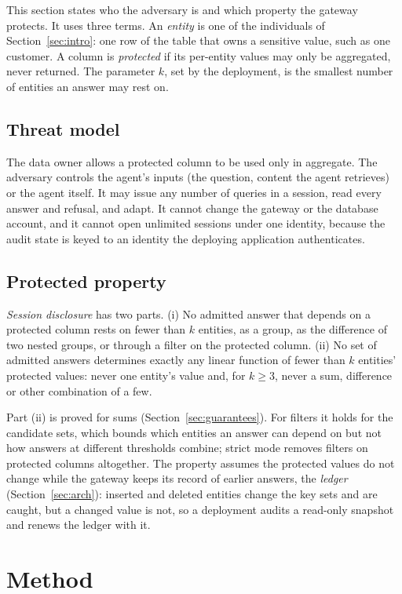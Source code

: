\documentclass[sigconf,nonacm]{acmart}
\begin{document}
This section states who the adversary is and which property the gateway protects. It uses three terms. An \emph{entity} is one of the individuals of Section~\ref{sec:intro}: one row of the table that owns a sensitive value, such as one customer. A column is \emph{protected} if its per-entity values may only be aggregated, never returned. The parameter $k$, set by the deployment, is the smallest number of entities an answer may rest on.

\subsection{Threat model}
The data owner allows a protected column to be used only in aggregate. The adversary controls the agent's inputs (the question, content the agent retrieves) or the agent itself. It may issue any number of queries in a session, read every answer and refusal, and adapt. It cannot change the gateway or the database account, and it cannot open unlimited sessions under one identity, because the audit state is keyed to an identity the deploying application authenticates.

\subsection{Protected property}
\emph{Session disclosure} has two parts. (i) No admitted answer that depends on a protected column rests on fewer than $k$ entities, as a group, as the difference of two nested groups, or through a filter on the protected column. (ii) No set of admitted answers determines exactly any linear function of fewer than $k$ entities' protected values: never one entity's value and, for $k\ge3$, never a sum, difference or other combination of a few.

Part (ii) is proved for sums (Section~\ref{sec:guarantees}). For filters it holds for the candidate sets, which bounds which entities an answer can depend on but not how answers at different thresholds combine; strict mode removes filters on protected columns altogether. The property assumes the protected values do not change while the gateway keeps its record of earlier answers, the \emph{ledger} (Section~\ref{sec:arch}): inserted and deleted entities change the key sets and are caught, but a changed value is not, so a deployment audits a read-only snapshot and renews the ledger with it.

\section{Method}\label{sec:method}
\end{document}

